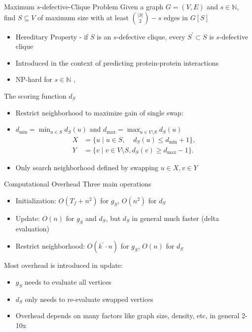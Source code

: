 \documentclass{beamer}
\begin{document}
\begin{frame}{Maximum $s$-defective-Clique Problem}
    Given a graph $G = (V,E)$ and $s \in \mathbb{N}$, find $S \subseteq V$ of maximum size with at least $\binom{|S|}{2} - s$ edges in $G[S]$
    \begin{itemize}
        \item<1-> Hereditary Property - if $S$ is an $s$-defective clique, every $S^\prime \subset S$ is $s$-defective clique
        \item<2-> Introduced in the context of predicting protein-protein interactions~\cite{Yu2006}
        \item<3-> NP-hard for $s \in \mathbb{N}$ \cite{Yannakakis1978},\cite{Trukhanov2013}
    \end{itemize}
\end{frame}

\begin{frame}{The scoring function $d_S$}
    \begin{itemize}
        \item Restrict neighborhood to maximize gain of single swap:
        \item $d_{\min} = \min_{u \in S} d_S(u)$ and $d_{\max} = \max_{u \in V \setminus S} d_S(u)$
        \begin{align*}
            X &= \{ u \mid u \in S,~~~~~ d_S(u) \leq d_{\min} + 1 \}, \\
            Y &= \{ v \mid v \in V \setminus S, d_S(v) \geq d_{\max} - 1 \}.
        \end{align*}
        \item Only search neighborhood defined by swapping $u \in X, v \in Y$
    \end{itemize}
\end{frame}

\begin{frame}{Computational Overhead}
    Three main operations
    \begin{itemize}
        \item Initialization: $O(T_f + n^2)$ for $g_S$, $O(n^2)$ for $d_S$
        \item Update: $O(n)$ for $g_S$ and $d_S$, but $d_S$ in general much faster (delta evaluation)
        \item Restrict neighborhood: $O(k^\prime \cdot n)$ for $g_S$, $O(n)$ for $d_S$
    \end{itemize}
    Most overhead is introduced in update: 
    \begin{itemize}
        \item $g_S$ needs to evaluate all vertices
        \item $d_S$ only needs to re-evaluate swapped vertices
        \item Overhead depends on many factors like graph size, density, etc, in general 2-10x
    \end{itemize}
\end{frame}
\end{document}
